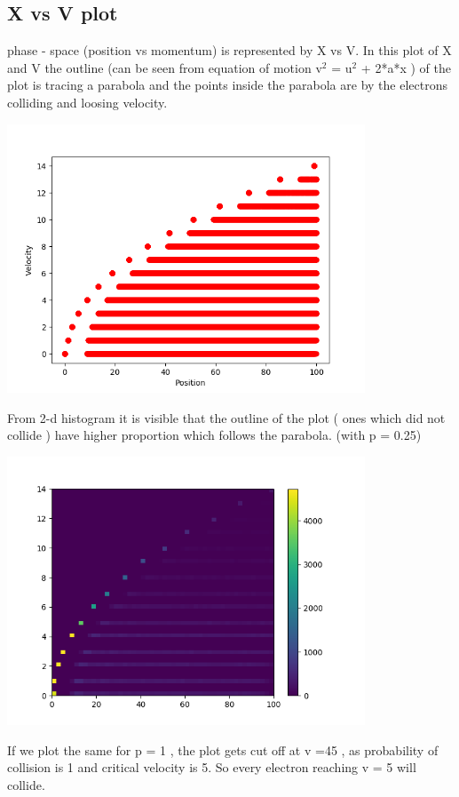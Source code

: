 \documentclass[a4paper]{article}
\begin{document}
\subsection{X vs V plot}
phase - space (position vs momentum) is represented by X  vs V. In this plot of X and V the outline (can be seen from equation of motion v$^{2}$ = u$^{2}$ + 2*a*x )  of the plot is tracing a parabola and the points inside the parabola are by the electrons colliding and loosing velocity. 
\begin{center}
\includegraphics[width=0.8\textwidth]{Figure_3-2_5.png}
\end{center}
From 2-d histogram it is visible that the outline of the plot ( ones which did not collide ) have higher proportion which follows the parabola. (with p = 0.25)
\begin{center}
\includegraphics[width=0.8\textwidth]{Figure_4-2_5.png}
\end{center}
If we plot the same for p = 1 , the plot gets cut off at v =45 , as probability of collision is 1 and critical velocity is 5. So every electron reaching v = 5 will collide. 
\end{document}
